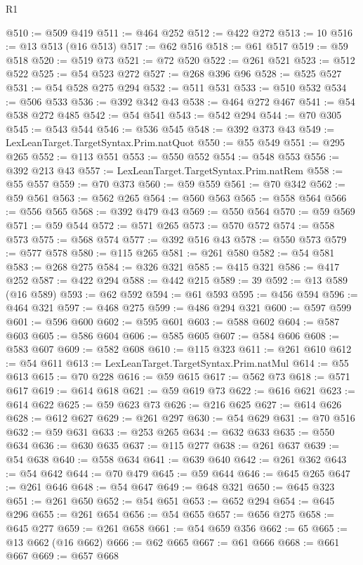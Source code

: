 \begin{lexlean}{R1}
\begin{coremodule}
@510 := @509 @419
@511 := @464 @252
@512 := @422 @272
@513 := 10
@516 := @13 @513 (@16 @513)
@517 := @62 @516
@518 := @61 @517
@519 := @59 @518
@520 := @519 @73
@521 := @72 @520
@522 := @261 @521
@523 := @512 @522
@525 := @54 @523 @272
@527 := @268 @396 @96
@528 := @525 @527
@531 := @54 @528 @275 @294
@532 := @511 @531
@533 := @510 @532
@534 := @506 @533
@536 := @392 @342 @43
@538 := @464 @272 @467
@541 := @54 @538 @272 @485
@542 := @54 @541
@543 := @542 @294
@544 := @70 @305
@545 := @543 @544
@546 := @536 @545
@548 := @392 @373 @43
@549 := LexLeanTarget.TargetSyntax.Prim.natQuot
@550 := @55 @549
@551 := @295 @265
@552 := @113 @551
@553 := @550 @552
@554 := @548 @553
@556 := @392 @213 @43
@557 := LexLeanTarget.TargetSyntax.Prim.natRem
@558 := @55 @557
@559 := @70 @373
@560 := @59 @559
@561 := @70 @342
@562 := @59 @561
@563 := @562 @265
@564 := @560 @563
@565 := @558 @564
@566 := @556 @565
@568 := @392 @479 @43
@569 := @550 @564
@570 := @59 @569
@571 := @59 @544
@572 := @571 @265
@573 := @570 @572
@574 := @558 @573
@575 := @568 @574
@577 := @392 @516 @43
@578 := @550 @573
@579 := @577 @578
@580 := @115 @265
@581 := @261 @580
@582 := @54 @581
@583 := @268 @275
@584 := @326 @321
@585 := @415 @321
@586 := @417 @252
@587 := @422 @294
@588 := @442 @215
@589 := 39
@592 := @13 @589 (@16 @589)
@593 := @62 @592
@594 := @61 @593
@595 := @456 @594
@596 := @464 @321
@597 := @468 @275
@599 := @486 @294 @321
@600 := @597 @599
@601 := @596 @600
@602 := @595 @601
@603 := @588 @602
@604 := @587 @603
@605 := @586 @604
@606 := @585 @605
@607 := @584 @606
@608 := @583 @607
@609 := @582 @608
@610 := @115 @323
@611 := @261 @610
@612 := @54 @611
@613 := LexLeanTarget.TargetSyntax.Prim.natMul
@614 := @55 @613
@615 := @70 @228
@616 := @59 @615
@617 := @562 @73
@618 := @571 @617
@619 := @614 @618
@621 := @59 @619 @73
@622 := @616 @621
@623 := @614 @622
@625 := @59 @623 @73
@626 := @216 @625
@627 := @614 @626
@628 := @612 @627
@629 := @261 @297
@630 := @54 @629
@631 := @70 @516
@632 := @59 @631
@633 := @253 @265
@634 := @632 @633
@635 := @550 @634
@636 := @630 @635
@637 := @115 @277
@638 := @261 @637
@639 := @54 @638
@640 := @558 @634
@641 := @639 @640
@642 := @261 @362
@643 := @54 @642
@644 := @70 @479
@645 := @59 @644
@646 := @645 @265
@647 := @261 @646
@648 := @54 @647
@649 := @648 @321
@650 := @645 @323
@651 := @261 @650
@652 := @54 @651
@653 := @652 @294
@654 := @645 @296
@655 := @261 @654
@656 := @54 @655
@657 := @656 @275
@658 := @645 @277
@659 := @261 @658
@661 := @54 @659 @356
@662 := 65
@665 := @13 @662 (@16 @662)
@666 := @62 @665
@667 := @61 @666
@668 := @661 @667
@669 := @657 @668

\end{coremodule}
\end{lexlean}
